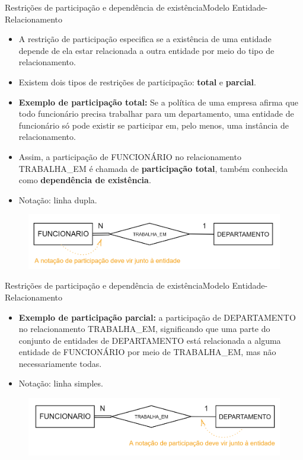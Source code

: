 \documentclass[t]{beamer}
\begin{document}
\begin{ftst}{\large Restrições de participação e dependência de existência}{Modelo Entidade-Relacionamento}
\footnotesize
\begin{itemize}
    \item A restrição de participação especifica se a existência de uma entidade depende de ela estar relacionada a outra entidade por meio do tipo de relacionamento.
    \item Existem dois tipos de restrições de participação: \textbf{total }e \textbf{parcial}.
    \item \textbf{Exemplo de participação total:} Se a política de uma empresa afirma que todo funcionário precisa trabalhar para um departamento, uma entidade de funcionário só pode existir se participar em, pelo menos, uma instância de relacionamento. 
    \item Assim, a participação de FUNCIONÁRIO no relacionamento TRABALHA\_EM é chamada de \textbf{participação total}, também conhecida como \textbf{dependência de existência}.
    \item Notação: linha dupla.
\end{itemize}

\begin{figure}
    \centering
    \includegraphics[scale=0.2]{Figuras/01_20.png}
\end{figure}


\end{ftst}


\begin{ftst}{\large Restrições de participação e dependência de existência}{Modelo Entidade-Relacionamento}
\begin{itemize}
    \item \textbf{Exemplo de participação parcial:} a participação de DEPARTAMENTO no relacionamento TRABALHA\_EM, significando que uma parte do conjunto de entidades de DEPARTAMENTO está relacionada a alguma entidade de FUNCIONÁRIO por meio de TRABALHA\_EM, mas não necessariamente todas.
    \item Notação: linha simples.
\end{itemize}

\begin{figure}
    \centering
    \includegraphics[scale=0.2]{Figuras/01_21.png}
\end{figure}


\end{ftst}
\end{document}
